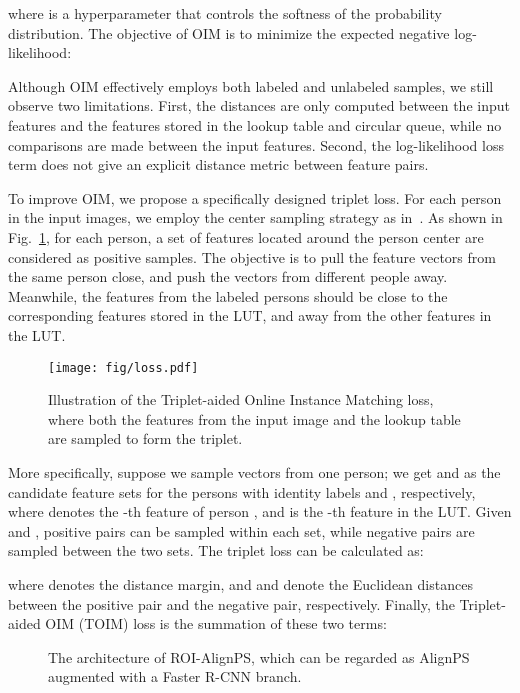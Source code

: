 \documentclass[journal]{IEEEtran}
\begin{document}
where  is a hyperparameter that controls the softness of the probability distribution. The objective of OIM is to minimize the expected negative log-likelihood:


Although OIM effectively employs both labeled and unlabeled samples, we still observe two limitations. First, the distances are only computed between the input features and the features stored in the lookup table and circular queue, while no comparisons are made between the input features. Second, the log-likelihood loss term does not give an explicit distance metric between feature pairs. 

To improve OIM, we propose a specifically designed triplet loss. For each person in the input images, we employ the center sampling strategy as in~\cite{DBLP:journals/tip/KongSLJLS20}. As shown in Fig.~\ref{fig:loss}, for each person, a set of features located around the person center are considered as positive samples. The objective is to pull the feature vectors from the same person close, and push the vectors from different people away. Meanwhile, the features from the labeled persons should be close to the corresponding features stored in the LUT, and away from the other features in the LUT.

\begin{figure}[t]
\centering
\texttt{[image: fig/loss.pdf]}
\caption{Illustration of the Triplet-aided Online Instance Matching loss, where both the features from the input image and the lookup table are sampled to form the triplet.}
\label{fig:loss}
\end{figure}

More specifically, suppose we sample  vectors from one person; we get  and  as the candidate feature sets for the persons with identity labels  and , respectively, where  denotes the -th feature of person , and  is the -th feature in the LUT. Given  and , positive pairs can be sampled within each set, while negative pairs are sampled between the two sets. The triplet loss can be calculated as:

where  denotes the distance margin, and  and  denote the Euclidean distances between the positive pair and the negative pair, respectively. Finally, the Triplet-aided OIM (TOIM) loss is the summation of these two terms:



\begin{figure*}[t]
\centering
{}
\hspace{1mm}
\centering
{}
 \caption{The architecture of ROI-AlignPS, which can be regarded as AlignPS augmented with a Faster R-CNN branch.}
 \label{fig:ralignps}
\end{figure*}
\end{document}
